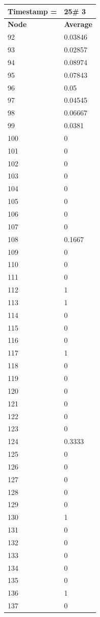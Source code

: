 \begin{tabular}{|l||l|}
\hline
\textbf{Timestamp =} & \textbf{25}\# 3\\\hline
	\textbf{Node} & \textbf{Average} \\ \hline
\hline
	92 & 0.03846 \\ \hline
	93 & 0.02857 \\ \hline
	94 & 0.08974 \\ \hline
	95 & 0.07843 \\ \hline
	96 & 0.05 \\ \hline
	97 & 0.04545 \\ \hline
	98 & 0.06667 \\ \hline
	99 & 0.0381 \\ \hline
	100 & 0 \\ \hline
	101 & 0 \\ \hline
	102 & 0 \\ \hline
	103 & 0 \\ \hline
	104 & 0 \\ \hline
	105 & 0 \\ \hline
	106 & 0 \\ \hline
	107 & 0 \\ \hline
	108 & 0.1667 \\ \hline
	109 & 0 \\ \hline
	110 & 0 \\ \hline
	111 & 0 \\ \hline
	112 & 1 \\ \hline
	113 & 1 \\ \hline
	114 & 0 \\ \hline
	115 & 0 \\ \hline
	116 & 0 \\ \hline
	117 & 1 \\ \hline
	118 & 0 \\ \hline
	119 & 0 \\ \hline
	120 & 0 \\ \hline
	121 & 0 \\ \hline
	122 & 0 \\ \hline
	123 & 0 \\ \hline
	124 & 0.3333 \\ \hline
	125 & 0 \\ \hline
	126 & 0 \\ \hline
	127 & 0 \\ \hline
	128 & 0 \\ \hline
	129 & 0 \\ \hline
	130 & 1 \\ \hline
	131 & 0 \\ \hline
	132 & 0 \\ \hline
	133 & 0 \\ \hline
	134 & 0 \\ \hline
	135 & 0 \\ \hline
	136 & 1 \\ \hline
	137 & 0 \\ \hline
\end{tabular}

